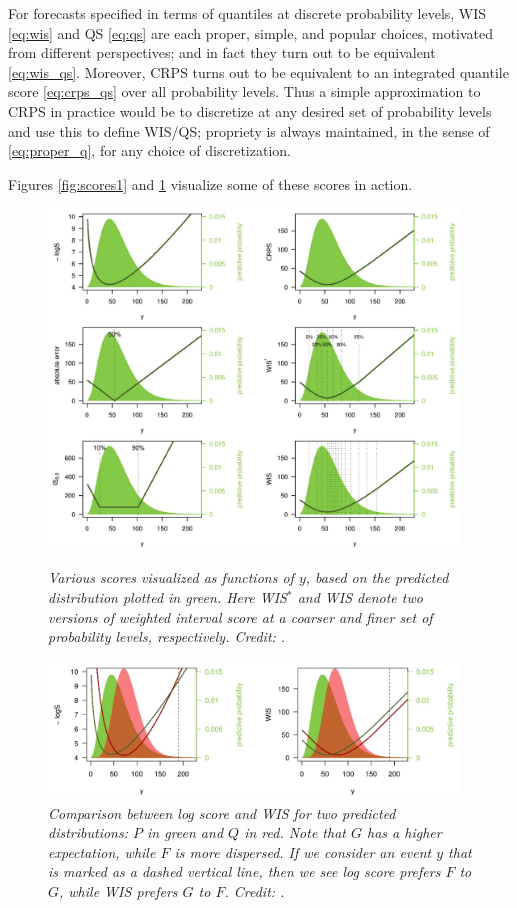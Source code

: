 \documentclass{article}
\begin{document}
For forecasts specified in terms of quantiles at discrete probability levels,
WIS \eqref{eq:wis} and QS \eqref{eq:qs} are each proper, simple, and popular
choices, motivated from different perspectives; and in fact they turn out to be 
equivalent \eqref{eq:wis_qs}. Moreover, CRPS turns out to be equivalent
to an integrated quantile score \eqref{eq:crps_qs} over all probability
levels. Thus a simple approximation to CRPS in practice would be to discretize
at any desired set of probability levels and use this to define WIS/QS;
propriety is always maintained, in the sense of \eqref{eq:proper_q}, for any
choice of discretization.     

Figures \ref{fig:scores1} and \ref{fig:scores2} visualize some of these scores
in action. 

\begin{figure}[p]
\centering
\includegraphics[width=0.975\textwidth]{scores1.png}
\caption{\it Various scores visualized as functions of $y$, based on the
  predicted distribution plotted in green. Here WIS$^*$ and WIS denote two
  versions of weighted interval score at a coarser and finer set of probability
  levels, respectively. Credit: \citet{bracher2021evaluating}.}       
\label{fig:scores1}   

\bigskip\medskip

\includegraphics[width=0.975\textwidth]{scores2.png}
\caption{\it Comparison between log score and WIS for two predicted
  distributions: $P$ in green and $Q$ in red. Note that $G$ has a higher
  expectation, while $F$ is more dispersed. If we consider an event $y$ that is
  marked as a dashed vertical line, then we see log score prefers $F$ to $G$,
  while WIS prefers $G$ to $F$. Credit: \citet{bracher2021evaluating}.}           
\label{fig:scores2}
\end{figure}
\end{document}
